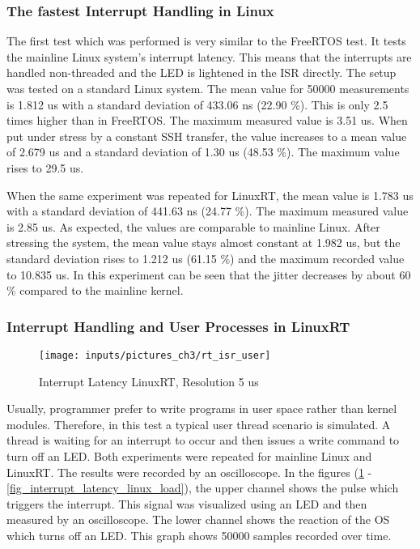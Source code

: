 \subsubsection{The fastest Interrupt Handling in Linux}
The first test which was performed is very similar to the FreeRTOS test. 
It tests the mainline Linux system's interrupt latency.
This means that the interrupts are handled non-threaded and the \ac{LED} is lightened in the \ac{ISR} directly.
The setup was tested on a standard Linux system.
The mean value for 50000 measurements is 1.812 us with a standard deviation of 433.06 ns (22.90 \%). 
This is only 2.5 times higher than in FreeRTOS. 
The maximum measured value is 3.51 us.
When put under stress by a constant \ac{SSH} transfer, the value increases to a mean value of 2.679 us and a standard deviation of 1.30 us (48.53 \%).
The maximum value rises to 29.5 us.
\par
When the same experiment was repeated for LinuxRT, the mean value is 1.783 us with a standard deviation of 441.63 ns (24.77 \%). 
The maximum measured value is 2.85 us.
As expected, the values are comparable to mainline Linux.
After stressing the system, the mean value stays almost constant at 1.982 us, but the standard deviation rises to 1.212 us (61.15 \%) and the maximum recorded value to 10.835 us.
In this experiment can be seen that the jitter decreases by about 60 \% compared to the mainline kernel.

\subsubsection{Interrupt Handling and User Processes in LinuxRT}\label{sss_interrupt_handling_user_rt}
\begin{figure}[htb]
	\begin{center}
		\texttt{[image: inputs/pictures\_ch3/rt\_isr\_user]}
	\end{center}
	\caption[Interrupt Latency LinuxRT]{Interrupt Latency LinuxRT, Resolution 5 us} 	\label{fig_interrupt_latency_linuxrt}
\end{figure}
Usually, programmer prefer to write programs in user space rather than kernel modules. 
Therefore, in this test a typical user thread scenario is simulated.
A thread is waiting for an interrupt to occur and then issues a write command to turn off an \ac{LED}. 
Both experiments were repeated for mainline Linux and LinuxRT. 
The results were recorded by an oscilloscope.
In the figures (\ref{fig_interrupt_latency_linuxrt} - \ref{fig_interrupt_latency_linux_load}), the upper channel shows the pulse which triggers the interrupt.
This signal was visualized using an \ac{LED} and then measured by an oscilloscope. 
The lower channel shows the reaction of the \ac{OS} which turns off an \ac{LED}. 
This graph shows 50000 samples recorded over time. 

